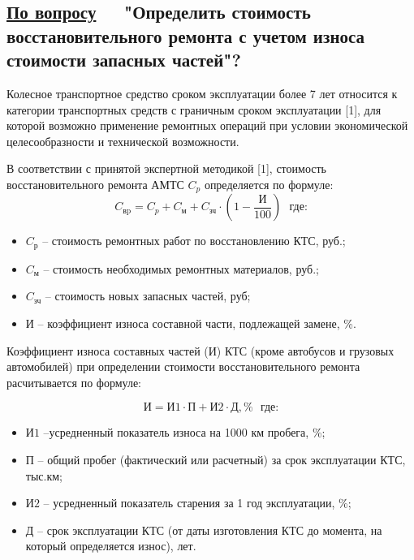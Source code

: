\subsection{\underline{По  вопросу}\, \, \,	\textbf{\small{"Определить стоимость восстановительного ремонта с учетом износа стоимости запасных частей"?}}}
\renewcommand\baselinestretch{1.2}\small\normalsize
Колесное транспортное средство сроком эксплуатации более 7 лет относится к категории транспортных средств с граничным сроком эксплуатации [1], для которой возможно применение ремонтных операций при условии экономической целесообразности и  технической возможности.  
                                         
В соответствии с принятой экспертной методикой [1], стоимость восстановительного ремонта АМТС  $ C_p $ определяется по формуле:
%
\begin{equation}\label{eq:r}
C_\text{вp} =C_p + C_\text{м} + C_\text{зч}\cdot\left( 1-\frac{\text{И}}{100}\right)  \,\,\,\, \text{где:}
\end{equation}
%
%
\begin{itemize}
%	
\item[ ]$C_\text {р} $ --  стоимость ремонтных работ по восстановлению КТС, руб.;
\item[ ]$ C_\text{м} $ --  стоимость необходимых ремонтных материалов, руб.;
\item[ ]$ C_\text{зч} $ --  стоимость новых запасных частей, руб;
\item[ ] $ \text{И} $ -- коэффициент износа составной части, подлежащей замене, \%.
\end{itemize}
%
%
Коэффициент износа составных частей (И) КТС (кроме автобусов и грузовых автомобилей) при определении стоимости восстановительного ремонта расчитывается по формуле:

\begin{equation}\label{eqsnos}
\text{И} =\text{И1}\cdot\text{П}+\text{И2}\cdot \text{Д}, \%  \,\,\,\, \text{где:}
\end{equation}

\begin{itemize}
	\item [] $ \text{И1} $ --усредненный показатель износа на 1000 км пробега, \%; 
	\item [] $ \text{П} $ -- общий пробег (фактический или расчетный) за срок эксплуатации КТС, тыс.км;
	\item [] $ \text{И2} $ -- усредненный показатель старения за 1 год эксплуатации, \%;
	\item [] $ \text{Д} $ -- срок эксплуатации КТС (от даты изготовления КТС до момента, на который определяется износ), лет. 
\end{itemize}

